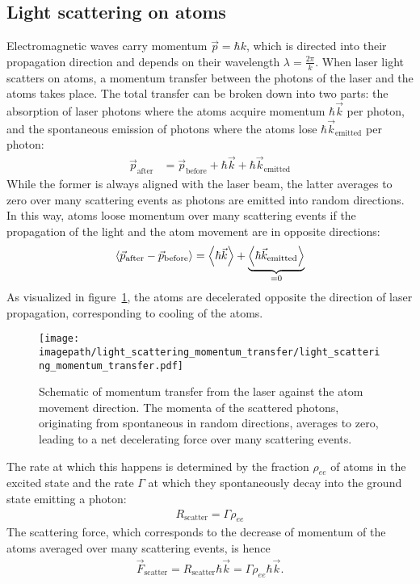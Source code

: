 \subsection*{Light scattering on atoms}
Electromagnetic waves carry momentum $\vec p = \hbar k$, which is directed into their propagation direction and depends on their wavelength $\lambda = \frac{2\pi}{k}$. When laser light scatters on atoms, a momentum transfer between the photons of the laser and the atoms takes place. The total transfer can be broken down into two parts: the absorption of laser photons where the atoms acquire momentum $\hbar \vec k$ per photon, and the spontaneous emission of photons where the atoms lose $\hbar \vec k_\text{emitted}$ per photon:
\begin{align}
    \vec p_\text{after} &= \vec p_\text{before} + \hbar \vec k + \hbar \vec k_\text{emitted}
\end{align}
While the former is always aligned with the laser beam, the latter averages to zero over many scattering events as photons are emitted into random directions. In this way, atoms loose momentum over many scattering events if the propagation of the light and the atom movement are in opposite directions:
\begin{align}
    \Braket{\vec p_\text{after} - \vec p_\text{before}} = \Braket{\hbar \vec k} + \underbrace{\Braket{\hbar \vec k_\text{emitted}}}_{=0}
\end{align}
As visualized in figure~\ref{fig:light_scattering_momentum_transfer}, the atoms are decelerated opposite the direction of laser propagation, corresponding to cooling of the atoms.

\begin{figure}    
    \centering
    \texttt{[image: \\imagepath/light\_scattering\_momentum\_transfer/light\_scattering\_momentum\_transfer.pdf]}
    \caption{Schematic of momentum transfer from the laser against the atom movement direction. The momenta of the scattered photons, originating from spontaneous in random directions, averages to zero, leading to a net decelerating force over many scattering events.
    }
    \label{fig:light_scattering_momentum_transfer}
\end{figure}

The rate at which this happens is determined by the fraction $\rho_{ee}$ of atoms in the excited state and the rate $\Gamma$ at which they spontaneously decay into the ground state emitting a photon:
\begin{align}
    R_\text{scatter} = \Gamma \rho_{ee}
\end{align}
The scattering force, which corresponds to the decrease of momentum of the atoms averaged over many scattering events, is hence
\begin{align}
    \vec F_\text{scatter} = R_\text{scatter} \hbar \vec k = \Gamma \rho_{ee} \hbar \vec k.
\end{align}

